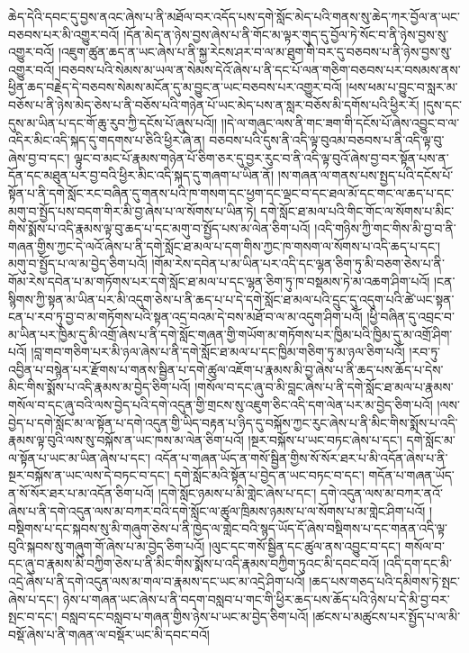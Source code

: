 ཆེད་དེའི་དབང་དུ་བྱས་ནའང་ཞེས་པ་ནི་མཐོལ་བར་འདོད་པས་དགེ་སློང་མེད་པའི་གནས་སུ་ཆེད་ཀར་བྱོལ་ན་ཡང་བཅབས་པར་མི་འགྱུར་བའོ། །དོན་མེད་ན་ཉེས་བྱས་ཞེས་པ་ནི་གོང་མ་ལྟར་གུད་དུ་བྱོལ་ཏེ་སོང་བ་ནི་ཉེས་བྱས་སུ་འགྱུར་བའོ། །འཇུག་ཚུན་ཆད་ན་ཡང་ཞེས་པ་ནི་སྐྱ་རེངས་ཤར་བ་ལ་མ་ཐུག་གི་བར་དུ་བཅབས་པ་ནི་ཉེས་བྱས་སུ་འགྱུར་བའོ། །བཅབས་པའི་སེམས་མ་ཡལ་ན་སེམས་དེའོ་ཞེས་པ་ནི་དང་པོ་ལན་གཅིག་བཅབས་པར་བསམས་ནས་ཕྱིན་ཆད་བརྗེད་དེ་བཅབས་སེམས་མངོན་དུ་མ་བྱུང་ན་ཡང་བཅབས་པར་འགྱུར་བའོ། །ཕས་ཕམ་པ་བྱུང་བ་སླར་མ་བཅོས་པ་ནི་ཉེས་མེད་ཅེས་པ་ནི་བཅོས་པའི་གཉེན་པོ་ཡང་མེད་པས་ན་སླར་བཅོས་མི་དགོས་པའི་ཕྱིར་རོ། །དུས་དང་དུས་མ་ཡིན་པ་དང་གོ་ཆུ་རུབ་ཀྱི་དངོས་པོ་ཞུས་པའོ།། །།དེ་ལ་གཞུང་ལས་ནི་གང་ཟག་གི་དངོས་པོ་ཞེས་འབྱུང་བ་ལ་འདིར་མིང་འདི་སྐད་དུ་གདགས་པ་ཅིའི་ཕྱིར་ཞེ་ན། བཅབས་པའི་དུས་ནི་འདི་ལྟ་བུའམ་བཅབས་པ་ནི་འདི་ལྟ་བུ་ཞེས་བྱ་བ་དང་། ལྟུང་བ་མང་པོ་རྣམས་གཉེན་པོ་ཅིག་ཅར་དུ་བྱར་རུང་བ་ནི་འདི་ལྟ་བུའོ་ཞེས་བྱ་བར་སྟོན་པས་ན་དོན་དང་མཐུན་པར་བྱ་བའི་ཕྱིར་མིང་འདི་སྐད་དུ་གཞག་པ་ཡིན་ནོ། །ས་གཞན་ལ་གནས་པས་སྤྱད་པའི་དངོས་པོ་སྟོན་པ་ནི་དགེ་སློང་རང་བཞིན་དུ་གནས་པའི་ཁ་གསག་དང་ཕྱག་དང་ལྡང་བ་དང་ཐལ་མོ་དང་གང་ལ་ཆད་པ་དང་མགུ་བ་སྤྱོད་པས་བདག་གིར་མི་བྱ་ཞེས་པ་ལ་སོགས་པ་ཡིན་ཏེ། དགེ་སློང་ཐ་མལ་པའི་གིང་གོང་ལ་སོགས་པ་མིང་གིས་སྨོས་པ་འདི་རྣམས་ལྟ་བུ་ཆད་པ་དང་མགུ་བ་སྤྱོད་པས་མ་ལེན་ཅིག་པའོ། །འདི་གཉིས་ཀྱི་གང་གིས་མི་བྱ་བ་ནི་གཞན་གྱིས་ཀྱང་དེ་ལའོ་ཞེས་པ་ནི་དགེ་སློང་ཐ་མལ་པ་དག་གིས་ཀྱང་ཁ་གསག་ལ་སོགས་པ་འདི་ཆད་པ་དང་། མགུ་བ་སྤྱོད་པ་ལ་མ་བྱེད་ཅིག་པའོ། །གོམ་རེས་དབེན་པ་མ་ཡིན་པར་འདི་དང་ལྷན་ཅིག་ཏུ་མི་བཅག་ཅེས་པ་ནི་གོམ་རེས་དབེན་པ་མ་གཏོགས་པར་དགེ་སློང་ཐ་མལ་པ་དང་ལྷན་ཅིག་ཏུ་ཁ་བསྡམས་ཏེ་མ་འཆག་ཤིག་པའོ། །ངན་སྙིགས་ཀྱི་སྟན་མ་ཡིན་པར་མི་འདུག་ཅེས་པ་ནི་ཆད་པ་པ་དེ་དགེ་སློང་ཐ་མལ་པའི་དྲུང་དུ་འདུག་པའི་ཚེ་ཡང་སྟན་ངན་པ་རབ་ཏུ་བྱ་བ་མ་གཏོགས་པའི་སྟན་འདྲ་བའམ་དེ་བས་མཐོ་བ་ལ་མ་འདུག་ཤིག་པའོ། །ཕྱི་བཞིན་དུ་འབྲང་བ་མ་ཡིན་པར་ཁྱིམ་དུ་མི་འགྲོ་ཞེས་པ་ནི་དགེ་སློང་གཞན་གྱི་གཡོག་མ་གཏོགས་པར་ཁྱིམ་པའི་ཁྱིམ་དུ་མ་འགྲོ་ཤིག་པའོ། །བླ་གབ་གཅིག་པར་མི་ཉལ་ཞེས་པ་ནི་དགེ་སློང་ཐ་མལ་པ་དང་ཁྱིམ་གཅིག་ཏུ་མ་ཉལ་ཅིག་པའོ། །རབ་ཏུ་འབྱིན་པ་བསྙེན་པར་རྫོགས་པ་གནས་སྦྱིན་པ་དགེ་ཚུལ་འཇོག་པ་རྣམས་མི་བྱ་ཞེས་པ་ནི་ཆད་པས་ཆོད་པ་དེས་མིང་གིས་སྨོས་པ་འདི་རྣམས་མ་བྱེད་ཅིག་པའོ། །གསོལ་བ་དང་ཞུ་བ་མི་བླང་ཞེས་པ་ནི་དགེ་སློང་ཐ་མལ་པ་རྣམས་གསོལ་བ་དང་ཞུ་བའི་ལས་བྱེད་པའི་དགེ་འདུན་གྱི་གྲངས་སུ་འཇུག་ཅིང་འདི་དག་ལེན་པར་མ་བྱེད་ཅིག་པའོ། །ལས་བྱེད་པ་དགེ་སློང་མ་ལ་སྟོན་པ་དགེ་འདུན་གྱི་ཡིད་བརྟན་པ་ཉིད་དུ་བསྐོས་ཀྱང་རུང་ཞེས་པ་ནི་མིང་གིས་སྨོས་པ་འདི་རྣམས་ལྟ་བུའི་ལས་སུ་བསྐོས་ན་ཡང་ཁས་མ་ལེན་ཅིག་པའོ། །སྔར་བསྐོས་པ་ཡང་བཏང་ཞེས་པ་དང་། དགེ་སློང་མ་ལ་སྟོན་པ་ཡང་མ་ཡིན་ཞེས་པ་དང་། འདོན་པ་གཞན་ཡོད་ན་གསོ་སྦྱིན་གྱིས་སོ་སོར་ཐར་པ་མི་འདོན་ཞེས་པ་ནི་སྔར་བསྐོས་ན་ཡང་ལས་དེ་བཏང་བ་དང་། དགེ་སློང་མའི་སྟོན་པ་བྱེད་ན་ཡང་བཏང་བ་དང་། གདོན་པ་གཞན་ཡོད་ན་སོ་སོར་ཐར་པ་མ་འདོན་ཅིག་པའོ། །དགེ་སློང་ཉམས་པ་མི་གླེང་ཞེས་པ་དང་། དགེ་འདུན་ལས་མ་བཀར་ནའོ་ཞེས་པ་ནི་དགེ་འདུན་ལས་མ་བཀར་བའི་དགེ་སློང་ལ་ཚུལ་ཁྲིམས་ཉམས་པ་ལ་སོགས་པ་མ་གླེང་ཤིག་པའོ། །བསྡིགས་པ་དང་སྐབས་སུ་མི་གཞུག་ཅེས་པ་ནི་ཁྱེད་ལ་གླེང་བའི་སྙད་ཡོད་དོ་ཞེས་བསྡིགས་པ་དང་གནན་འདི་ལྟ་བུའི་སྐབས་སུ་གཞུག་གོ་ཞེས་པ་མ་བྱེད་ཅིག་པའོ། །ལུང་དང་གསོ་སྦྱིན་དང་ཚུལ་ནས་འབྱུང་བ་དང་། གསོལ་བ་དང་ཞུ་བ་རྣམས་མི་བཀྱིག་ཅེས་པ་ནི་མིང་གིས་སྨོས་པ་འདི་རྣམས་བཀྱིག་ཏུའང་མི་དབང་བའོ། །འདི་དག་དང་མི་འདྲེ་ཞེས་པ་ནི་དགེ་འདུན་ལས་མ་གལ་བ་རྣམས་དང་ཡང་མ་འདྲེ་ཤིག་པའོ། །ཆད་པས་གཅད་པའི་དམིགས་ཏེ་སྤང་ཞེས་པ་དང་། ཉེས་པ་གཞན་ཡང་ཞེས་པ་ནི་བདག་བསླབ་པ་གང་གི་ཕྱིར་ཆད་པས་ཆོད་པའི་ཉེས་པ་དེ་མི་བྱ་བར་སྤང་བ་དང་། བསླབ་དང་བསླབ་པ་གཞན་གྱིས་ཉེས་པ་ཡང་མ་བྱེད་ཅིག་པའོ། །ཚངས་པ་མཚུངས་པར་སྤྱོད་པ་ལ་མི་བསྡོ་ཞེས་པ་ནི་གཞན་ལ་བསྡོར་ཡང་མི་དབང་བའོ། 